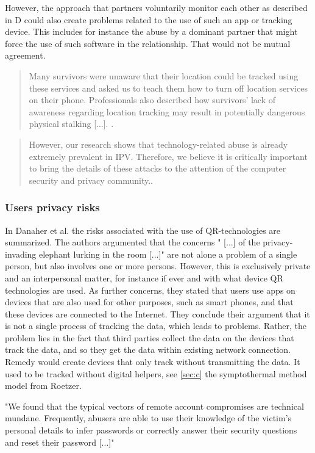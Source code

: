 However, the approach that partners voluntarily monitor each other as described in D could also create problems related to the use of such an app or tracking device. This includes for instance the abuse by a dominant partner that might force the use of such software in the relationship. That would not be mutual agreement.
\begin{quote}
Many survivors were unaware that their location could be tracked using these services and asked us to teach them how to turn off location services on their phone. Professionals also described how survivors' lack of awareness regarding location tracking may result in potentially dangerous physical stalking [...]. \cite{freed2018stalker}.
\end{quote}
\begin{quote}
	However, our research shows that technology-related abuse is already extremely prevalent in IPV. Therefore, we believe it is critically important to bring the details of these attacks to the attention of the computer security and privacy community.\cite{freed2018stalker}.
\end{quote}



\subsubsection{Users privacy risks}
In Danaher et al. \cite{doi:10.1080/15265161.2017.1422294} the risks associated with the use of \acs{QR}-technologies are summarized.
The authors argumented that the concerns " [...] of the privacy-invading elephant lurking in the room [...]" are not alone a problem of a single person, but also involves one or more persons. However, this is exclusively private and an interpersonal matter, for instance if ever and with what device \acs{QR} technologies are used.
As further concerns, they stated that users use apps on devices that are also used for other purposes, such as smart phones, and that these devices are connected to the Internet. 
They conclude their argument that it is not a single process of tracking the data, which leads to problems. Rather, the problem lies in the fact that third parties collect the data on the devices that track the data, and so they get the data within existing network connection.
Remedy would create devices that only track without transmitting the data.
It used to be tracked without digital helpers, see  \ref{sec:c} the symptothermal method model from Roetzer.

"We found that the typical vectors of remote account compromises are technical mundane. Frequently, abusers are able to use their knowledge of the victim's personal details to infer passwords or correctly answer their security questions and reset their password [...]" \cite{freed2018stalker}
